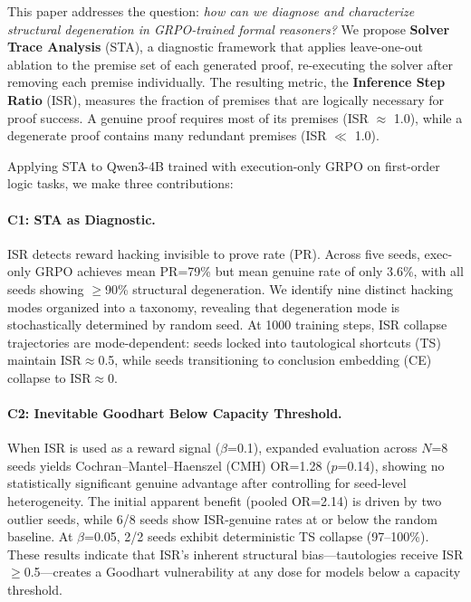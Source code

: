 \documentclass[11pt,a4paper]{article}
\newcommand{\isr}{\textsc{ISR}}
\newcommand{\sta}{\textsc{STA}}
\newcommand{\pr}{\textsc{PR}}
\newcommand{\grpo}{\textsc{GRPO}}
\begin{document}
This paper addresses the question: \emph{how can we diagnose and characterize structural degeneration in \grpo{}-trained formal reasoners?}
We propose \textbf{Solver Trace Analysis} (\sta{}), a diagnostic framework that applies leave-one-out ablation to the premise set of each generated proof, re-executing the solver after removing each premise individually.
The resulting metric, the \textbf{Inference Step Ratio} (\isr{}), measures the fraction of premises that are logically necessary for proof success.
A genuine proof requires most of its premises (\isr{} $\approx$ 1.0), while a degenerate proof contains many redundant premises (\isr{} $\ll$ 1.0).

Applying \sta{} to Qwen3-4B trained with execution-only \grpo{} on first-order logic tasks, we make three contributions:

\paragraph{C1: \sta{} as Diagnostic.}
\isr{} detects reward hacking invisible to prove rate (\pr{}).
Across five seeds, exec-only \grpo{} achieves mean \pr{}=79\% but mean genuine rate of only 3.6\%, with all seeds showing $\geq$90\% structural degeneration.
We identify nine distinct hacking modes organized into a taxonomy, revealing that degeneration mode is stochastically determined by random seed.
At 1000 training steps, \isr{} collapse trajectories are mode-dependent: seeds locked into tautological shortcuts (TS) maintain \isr{}$\approx$0.5, while seeds transitioning to conclusion embedding (CE) collapse to \isr{}$\approx$0.

\paragraph{C2: Inevitable Goodhart Below Capacity Threshold.}
When \isr{} is used as a reward signal ($\beta$=0.1), expanded evaluation across $N$=8 seeds yields Cochran--Mantel--Haenszel (CMH) OR=1.28 ($p$=0.14), showing no statistically significant genuine advantage after controlling for seed-level heterogeneity.
The initial apparent benefit (pooled OR=2.14) is driven by two outlier seeds, while 6/8 seeds show \isr{}-genuine rates at or below the random baseline.
At $\beta$=0.05, 2/2 seeds exhibit deterministic TS collapse (97--100\%).
These results indicate that \isr{}'s inherent structural bias---tautologies receive \isr{}$\geq$0.5---creates a Goodhart vulnerability at any dose for models below a capacity threshold.
\end{document}
